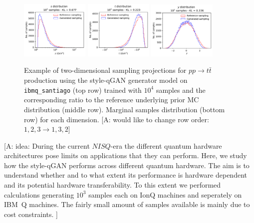 \documentclass[twocolumn,preprintnumbers,superscriptaddress]{revtex4-2}
\newcommand{\commentAF}[1]{{\color{cyan} {[A: #1]}}}
\begin{document}
\begin{figure}
  \includegraphics[width=0.29\textwidth]{plots/hardware/ibm_santiago/s-distribution_IBM_LHCdata_100k.pdf}%
  \includegraphics[width=0.29\textwidth]{plots/hardware/ibm_santiago/t-distribution_IBM_LHCdata_100k.pdf}%
  \includegraphics[width=0.29\textwidth]{plots/hardware/ibm_santiago/y-distribution_IBM_LHCdata_100k.pdf}

  \caption{\label{fig:ibm}Example of two-dimensional sampling projections for
  $pp \rightarrow t\bar{t}$ production using the style-qGAN generator
  model on {\tt ibmq\_santiago} (top row) trained with $10^4$ samples and
  the corresponding ratio to the reference underlying prior MC
  distribution (middle row). Marginal samples distribution (bottom row)
  for each dimension. \commentAF{would like to change row order: $1,2,3 \rightarrow 1,3,2$}}
\end{figure}

\commentAF{ idea:
During the current $NISQ$-era the different quantum hardware architectures pose limits on applications that they can perform. Here, we study how the style-qGAN  performs across different quantum hardware. The aim is to understand whether and to what extent its performance is hardware dependent and its potential hardware transferability. To this extent we performed calculations generating $10^3$ samples each on IonQ machines and seperately on IBM~Q
machines. The fairly small amount of samples available is mainly due to cost constraints.
}
\end{document}
